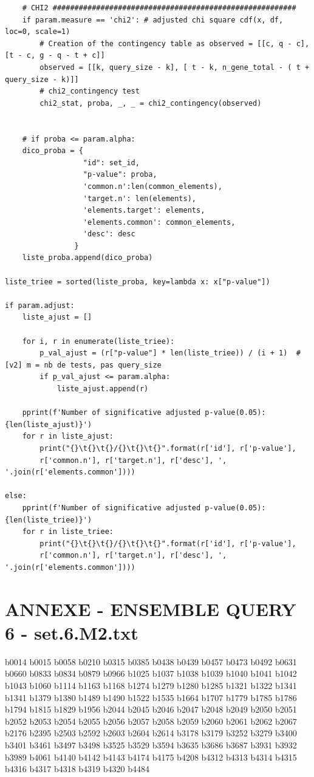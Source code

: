 \documentclass[a4paper,11pt,openright]{report}
\begin{document}
\begin{verbatim}
    # CHI2 ########################################################
    if param.measure == 'chi2': # adjusted chi square cdf(x, df, loc=0, scale=1)
        # Creation of the contingency table as observed = [[c, q - c], [t - c, g - q - t + c]]
        observed = [[k, query_size - k], [ t - k, n_gene_total - ( t + query_size - k)]]
        # chi2_contingency test
        chi2_stat, proba, _, _ = chi2_contingency(observed)


    # if proba <= param.alpha:
    dico_proba = {
                  "id": set_id, 
                  "p-value": proba,
                  'common.n':len(common_elements), 
                  'target.n': len(elements),
                  'elements.target': elements, 
                  'elements.common': common_elements,
                  'desc': desc
                }      
    liste_proba.append(dico_proba)
    
liste_triee = sorted(liste_proba, key=lambda x: x["p-value"])

if param.adjust:
    liste_ajust = []
    
    for i, r in enumerate(liste_triee):
        p_val_ajust = (r["p-value"] * len(liste_triee)) / (i + 1)  # [v2] m = nb de tests, pas query_size
        if p_val_ajust <= param.alpha:
            liste_ajust.append(r)
            
    pprint(f'Number of significative adjusted p-value(0.05): {len(liste_ajust)}')
    for r in liste_ajust:
        print("{}\t{}\t{}/{}\t{}\t{}".format(r['id'], r['p-value'], 
        r['common.n'], r['target.n'], r['desc'], ', '.join(r['elements.common'])))

else:
    pprint(f'Number of significative adjusted p-value(0.05): {len(liste_triee)}')
    for r in liste_triee:
        print("{}\t{}\t{}/{}\t{}\t{}".format(r['id'], r['p-value'], 
        r['common.n'], r['target.n'], r['desc'], ', '.join(r['elements.common'])))
\end{verbatim}

\chapter{ANNEXE - ENSEMBLE QUERY 6 - set.6.M2.txt}
\newpage
\label{annexe:Q6}

b0014 b0015 b0058 b0210 b0315 b0385 b0438 b0439 b0457 b0473 b0492 b0631 b0660 b0833 b0834 b0879 b0966 b1025 b1037 b1038 b1039 b1040 b1041 b1042 b1043 b1060 b1114 b1163 b1168 b1274 b1279 b1280 b1285 b1321 b1322 b1341 b1341 b1379 b1380 b1489 b1490 b1522 b1535 b1664 b1707 b1779 b1785 b1786 b1794 b1815 b1829 b1956 b2044 b2045 b2046 b2047 b2048 b2049 b2050 b2051 b2052 b2053 b2054 b2055 b2056 b2057 b2058 b2059 b2060 b2061 b2062 b2067 b2176 b2395 b2503 b2592 b2603 b2604 b2614 b3178 b3179 b3252 b3279 b3400 b3401 b3461 b3497 b3498 b3525 b3529 b3594 b3635 b3686 b3687 b3931 b3932 b3989 b4061 b4140 b4142 b4143 b4174 b4175 b4208 b4312 b4313 b4314 b4315 b4316 b4317 b4318 b4319 b4320 b4484 
\end{document}
